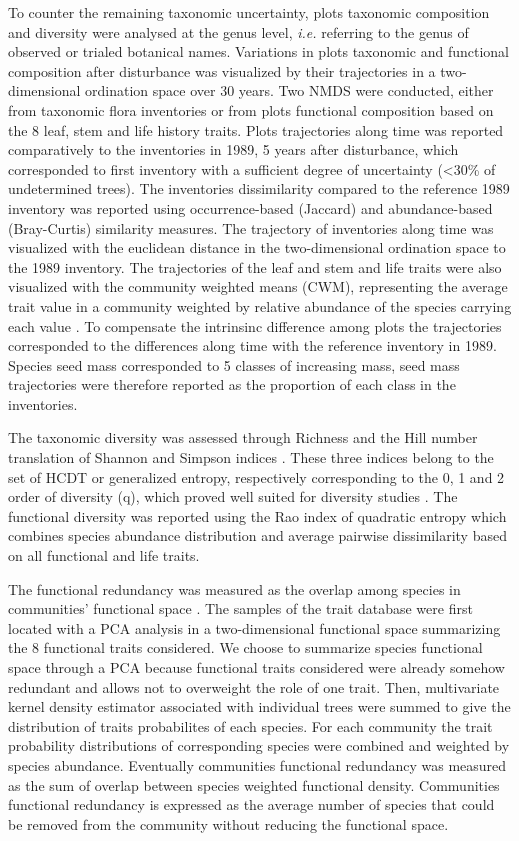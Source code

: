 \documentclass[fleqn,10pt]{ArtEcoFoG} %
\theoremstyle{definition}
\theoremstyle{definition}
\theoremstyle{definition}
\theoremstyle{remark}
\begin{document}
To counter the remaining taxonomic uncertainty, plots taxonomic
composition and diversity were analysed at the genus level, \emph{i.e.}
referring to the genus of observed or trialed botanical names.
Variations in plots taxonomic and functional composition after
disturbance was visualized by their trajectories in a two-dimensional
ordination space over 30 years. Two NMDS were conducted, either from
taxonomic flora inventories or from plots functional composition based
on the 8 leaf, stem and life history traits. Plots trajectories along
time was reported comparatively to the inventories in 1989, 5 years
after disturbance, which corresponded to first inventory with a
sufficient degree of uncertainty (\textless{}30\% of undetermined
trees). The inventories dissimilarity compared to the reference 1989
inventory was reported using occurrence-based (Jaccard) and
abundance-based (Bray-Curtis) similarity measures. The trajectory of
inventories along time was visualized with the euclidean distance in the
two-dimensional ordination space to the 1989 inventory. The trajectories
of the leaf and stem and life traits were also visualized with the
community weighted means (CWM), representing the average trait value in
a community weighted by relative abundance of the species carrying each
value \citep{Diaz2007, Garnier2004}. To compensate the intrinsinc
difference among plots the trajectories corresponded to the differences
along time with the reference inventory in 1989. Species seed mass
corresponded to 5 classes of increasing mass, seed mass trajectories
were therefore reported as the proportion of each class in the
inventories.

The taxonomic diversity was assessed through Richness and the Hill
number translation of Shannon and Simpson indices \citep{Hill1973}.
These three indices belong to the set of HCDT or generalized entropy,
respectively corresponding to the 0, 1 and 2 order of diversity (q),
which proved well suited for diversity studies
\citep{Patil1982, Tothmeresz1995}. The functional diversity was reported
using the Rao index of quadratic entropy which combines species
abundance distribution and average pairwise dissimilarity based on all
functional and life traits.

The functional redundancy was measured as the overlap among species in
communities' functional space \citep{Carmona2016}. The samples of the
trait database were first located with a PCA analysis in a
two-dimensional functional space summarizing the 8 functional traits
considered. We choose to summarize species functional space through a
PCA because functional traits considered were already somehow redundant
and allows not to overweight the role of one trait. Then, multivariate
kernel density estimator associated with individual trees were summed to
give the distribution of traits probabilites of each species. For each
community the trait probability distributions of corresponding species
were combined and weighted by species abundance. Eventually communities
functional redundancy was measured as the sum of overlap between species
weighted functional density. Communities functional redundancy is
expressed as the average number of species that could be removed from
the community without reducing the functional space.
\end{document}
